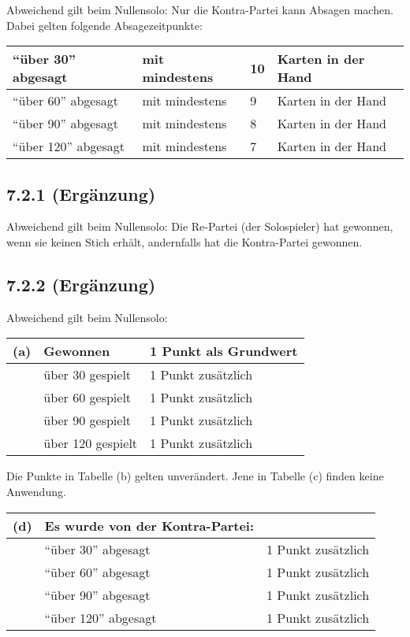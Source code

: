 Abweichend gilt beim Nullensolo: Nur die Kontra-Partei kann Absagen
machen. Dabei gelten folgende Absagezeitpunkte:

\begin{tabular}{ | l | l | l | l | }
  \hline
	``über 30'' abgesagt	& mit mindestens & 10	& Karten in der Hand \\ \hline
	``über 60'' abgesagt	& mit mindestens & 9	& Karten in der Hand \\ \hline
	``über 90'' abgesagt	& mit mindestens & 8	& Karten in der Hand \\ \hline
	``über 120'' abgesagt	& mit mindestens & 7	& Karten in der Hand \\ \hline
  \hline
\end{tabular}

\subsection*{7.2.1 (Ergänzung)}

Abweichend gilt beim Nullensolo: Die Re-Partei (der Solospieler) hat
gewonnen, wenn sie keinen Stich erhält, andernfalls hat die
Kontra-Partei gewonnen.


\subsection*{7.2.2 (Ergänzung)}

Abweichend gilt beim Nullensolo:

\begin{tabular}{ | l | l | l | }
  \hline
	(a)	& Gewonnen			& 1 Punkt als Grundwert \\ \hline
		& über 30 gespielt	& 1 Punkt zusätzlich \\ \hline
		& über 60 gespielt	& 1 Punkt zusätzlich \\ \hline
		& über 90 gespielt	& 1 Punkt zusätzlich \\ \hline
		& über 120 gespielt	& 1 Punkt zusätzlich \\ \hline
  \hline
\end{tabular}

Die Punkte in Tabelle (b) gelten unverändert. Jene in Tabelle (c)
finden keine Anwendung.


\begin{tabular}{ | l | l | l | }
  \hline
	(d)	& Es wurde von der Kontra-Partei: & \\ \hline
		& ``über 30'' abgesagt	& 1 Punkt zusätzlich \\ \hline
		& ``über 60'' abgesagt	& 1 Punkt zusätzlich \\ \hline
		& ``über 90'' abgesagt	& 1 Punkt zusätzlich \\ \hline
		& ``über 120'' abgesagt	& 1 Punkt zusätzlich \\ \hline
  \hline
\end{tabular}

